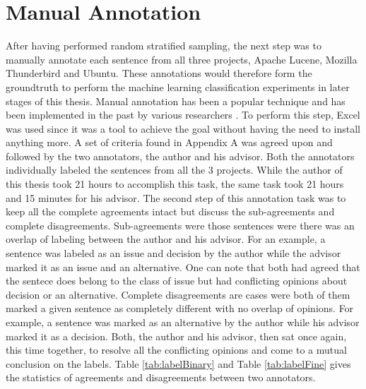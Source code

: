 \documentclass[a4paper,12pt,twoside]{report}
\begin{document}
\section{Manual Annotation}
After having performed random stratified sampling, the next step was to manually annotate each sentence from all three projects, Apache Lucene, Mozilla Thunderbird and Ubuntu. These annotations would therefore form the groundtruth to perform the machine learning classification experiments in later stages of this thesis. Manual annotation has been a popular technique and has been implemented in the past by various researchers \cite{Alkadhi2017} \cite{Nonnenmacher2017}. 
\newline \newline 
To perform this step, Excel was used since it was a tool to achieve the goal without having the need to install anything more. A set of criteria found in Appendix A was agreed upon and followed by the two annotators, the author and his advisor. Both the annotators individually labeled the sentences from all the 3 projects. While the author of this thesis took 21 hours to accomplish this task, the same task took 21 hours and 15 minutes for his advisor. 
\newline \newline 
The second step of this annotation task was to keep all the complete agreements intact but discuss the sub-agreements and complete disagreements. Sub-agreements were those sentences were there was an overlap of labeling between the author and his advisor. For an example, a sentence was labeled as an issue and decision by the author while the advisor marked it as an issue and an alternative. One can note that both had agreed that the sentece does belong to the class of issue but had conflicting opinions about decision or an alternative. 
\newline \newline
Complete disagreements are cases were both of them marked a given sentence as completely different with no overlap of opinions. For example, a sentence was marked as an alternative by the author while his advisor marked it as a decision. Both, the author and his advisor, then sat once again, this time together, to resolve all the conflicting opinions and come to a mutual conclusion on the labels. Table \ref{tab:labelBinary} and Table \ref{tab:labelFine} gives the statistics of agreements and disagreements between two annotators. 
\end{document}
